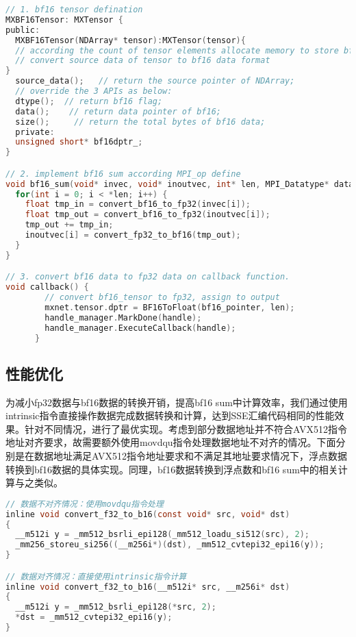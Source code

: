 \begin{lstlisting}[language=C, numbers=none]
// 1. bf16 tensor defination
MXBF16Tensor: MXTensor {
public:
  MXBF16Tensor(NDArray* tensor):MXTensor(tensor){
  // according the count of tensor elements allocate memory to store bf16 data;
  // convert source data of tensor to bf16 data format
}
  source_data();   // return the source pointer of NDArray;
  // override the 3 APIs as below:
  dtype();  // return bf16 flag;
  data();    // return data pointer of bf16;
  size();     // return the total bytes of bf16 data;
  private:
  unsigned short* bf16dptr_;
}

// 2. implement bf16 sum according MPI_op define
void bf16_sum(void* invec, void* inoutvec, int* len, MPI_Datatype* datatype) {
  for(int i = 0; i < *len; i++) {
    float tmp_in = convert_bf16_to_fp32(invec[i]);
    float tmp_out = convert_bf16_to_fp32(inoutvec[i]);
    tmp_out += tmp_in;
    inoutvec[i] = convert_fp32_to_bf16(tmp_out);
  }
}

// 3. convert bf16 data to fp32 data on callback function.
void callback() {
        // convert bf16_tensor to fp32, assign to output
        mxnet.tensor.dptr = BF16ToFloat(bf16_pointer, len);
        handle_manager.MarkDone(handle);
        handle_manager.ExecuteCallback(handle);
      }
\end{lstlisting}

\subsection{性能优化}
为减小fp32数据与bf16数据的转换开销，提高bf16 sum中计算效率，我们通过使用intrinsic指令直接操作数据完成数据转换和计算，达到SSE汇编代码相同的性能效果。针对不同情况，进行了最优实现。考虑到部分数据地址并不符合AVX512指令地址对齐要求，故需要额外使用movdqu指令处理数据地址不对齐的情况。下面分别是在数据地址满足AVX512指令地址要求和不满足其地址要求情况下，浮点数据转换到bf16数据的具体实现。同理，bf16数据转换到浮点数和bf16 sum中的相关计算与之类似。

\begin{lstlisting}[language=C, numbers=none]
// 数据不对齐情况：使用movdqu指令处理
inline void convert_f32_to_b16(const void* src, void* dst)
{
  __m512i y = _mm512_bsrli_epi128(_mm512_loadu_si512(src), 2);
  _mm256_storeu_si256((__m256i*)(dst), _mm512_cvtepi32_epi16(y));
}

// 数据对齐情况：直接使用intrinsic指令计算
inline void convert_f32_to_b16(__m512i* src, __m256i* dst)
{
  __m512i y = _mm512_bsrli_epi128(*src, 2);
  *dst = _mm512_cvtepi32_epi16(y);
}
\end{lstlisting}

